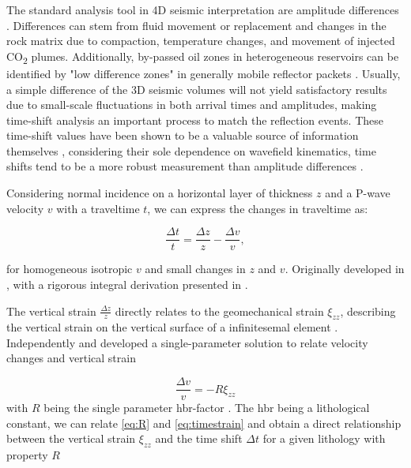 The standard analysis tool in 4D seismic interpretation are amplitude differences \citep{Johnston2013-jg}. Differences can stem from fluid movement or replacement and changes in the rock matrix due to compaction, temperature changes, and movement of injected CO\textsubscript{2} plumes. Additionally, by-passed oil zones in heterogeneous reservoirs can be identified by "low difference zones" in generally mobile reflector packets \citep{Yilmaz2003-hp}. Usually, a simple difference of the 3D seismic volumes will not yield satisfactory results due to small-scale fluctuations in both arrival times and amplitudes, making time-shift analysis an important process to match the reflection events. These time-shift values have been shown to be a valuable source of information themselves \citep{Hall2002-dt,Hatchell2005-eg}, considering their sole dependence on wavefield kinematics, time shifts tend to be a more robust measurement than amplitude differences \citep{Johnston2013-jg}.

Considering normal incidence on a horizontal layer of thickness $z$ and a P-wave velocity $v$ with a traveltime $t$, we can express the changes in traveltime as:

\begin{equation}
    \frac{\Delta t}{t} = \frac{\Delta z}{z} - \frac{\Delta v}{v},
    \label{eq:timestrain}
\end{equation}

for homogeneous isotropic $v$ and small changes in $z$ and $v$. Originally developed in \citet{Hatchell2005-eg}, with a rigorous integral derivation presented in \citet{macbeth2019post}.

The vertical strain $\frac{\Delta z}{z}$ directly relates to the geomechanical strain $\xi_{zz}$, describing the vertical strain on the vertical surface of a infinitesemal element \citep{Herwanger2015-qz}. Independently \citet{Hatchell2005-eg} and \citet{roste2006estimation} developed a single-parameter solution to relate velocity changes and vertical strain

\begin{equation}
    \frac{\Delta v}{v} = - R \xi_{zz}
    \label{eq:R}
\end{equation}
with $R$ being the single parameter \ac{hbr}-factor \citep{Hatchell2005-op, macbeth2019post}. The \ac{hbr} being a lithological constant, we can relate \cref{eq:R} and \cref{eq:timestrain} and obtain a direct relationship between the vertical strain $\xi_{zz}$ and the time shift $\Delta t$ for a given lithology with property $R$

